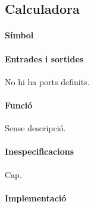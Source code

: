 \subsection{\label{sub:\projectname-Calculadora} \textsf{Calculadora}}

\paragraph{Símbol}

\begin{center}  \end{center}

\paragraph{Entrades i sortides}

No hi ha ports definits.

\paragraph{Funció}

Sense descripció.

\paragraph{Inespecificacions}

Cap.

\paragraph{Implementació}





\vspace{1cm}
